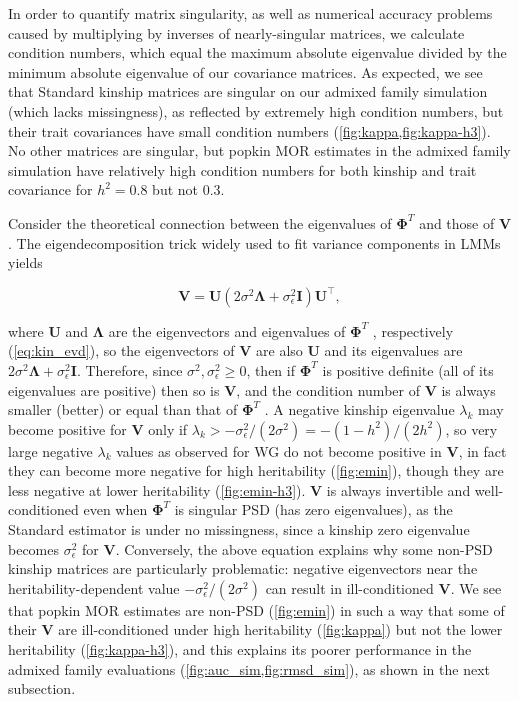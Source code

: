 \documentclass[11pt]{article}
\newcommand{\kinMat}[1][T]{%
  \ensuremath{%
    \mathbf{\Phi}^{#1}
  }%
  \xspace%
}%
\begin{document}
\begin{linenumbers}
In order to quantify matrix singularity, as well as numerical accuracy problems caused by multiplying by inverses of nearly-singular matrices, we calculate condition numbers, which equal the maximum absolute eigenvalue divided by the minimum absolute eigenvalue of our covariance matrices.
As expected, we see that Standard kinship matrices are singular on our admixed family simulation (which lacks missingness), as reflected by extremely high condition numbers, but their trait covariances have small condition numbers (\cref{fig:kappa,fig:kappa-h3}).
No other matrices are singular, but popkin MOR estimates in the admixed family simulation have relatively high condition numbers for both kinship and trait covariance for $h^2=0.8$ but not 0.3.

Consider the theoretical connection between the eigenvalues of \kinMat and those of $\mathbf{V}$.
The eigendecomposition trick widely used to fit variance components in LMMs \citep{kang_efficient_2008, lippert_fast_2011, svishcheva_rapid_2012, zhou_genome-wide_2012, sul_population_2018} yields
\begin{linenomath*}
$$
\mathbf{V} = \mathbf{U} \left( 2 \sigma^2 \mathbf{\Lambda} + \sigma^2_\epsilon \mathbf{I} \right) \mathbf{U}^\intercal,
$$
\end{linenomath*}
where $\mathbf{U}$ and $\mathbf{\Lambda}$ are the eigenvectors and eigenvalues of \kinMat, respectively (\cref{eq:kin_evd}),
so the eigenvectors of $\mathbf{V}$ are also $\mathbf{U}$ and its eigenvalues are $2 \sigma^2 \mathbf{\Lambda} + \sigma^2_\epsilon \mathbf{I}$.
Therefore, since $\sigma^2, \sigma^2_\epsilon \ge 0$, then if \kinMat is positive definite (all of its eigenvalues are positive) then so is $\mathbf{V}$, and the condition number of $\mathbf{V}$ is always smaller (better) or equal than that of \kinMat.
A negative kinship eigenvalue $\lambda_k$ may become positive for $\mathbf{V}$ only if $\lambda_k  > -\sigma^2_\epsilon/(2\sigma^2) = -(1-h^2)/(2h^2)$, so very large negative $\lambda_k$ values as observed for WG do not become positive in $\mathbf{V}$, in fact they can become more negative for high heritability (\cref{fig:emin}), though they are less negative at lower heritability (\cref{fig:emin-h3}).
$\mathbf{V}$ is always invertible and well-conditioned even when \kinMat is singular PSD (has zero eigenvalues), as the Standard estimator is under no missingness, since a kinship zero eigenvalue becomes $\sigma^2_\epsilon$ for $\mathbf{V}$.
Conversely, the above equation explains why some non-PSD kinship matrices are particularly problematic: negative eigenvectors near the heritability-dependent value $-\sigma^2_\epsilon/(2\sigma^2)$ can result in ill-conditioned $\mathbf{V}$.
We see that popkin MOR estimates are non-PSD (\cref{fig:emin}) in such a way that some of their $\mathbf{V}$ are ill-conditioned under high heritability (\cref{fig:kappa}) but not the lower heritability (\cref{fig:kappa-h3}), and this explains its poorer performance in the admixed family evaluations (\cref{fig:auc_sim,fig:rmsd_sim}), as shown in the next subsection.


\end{linenumbers}
\end{document}
